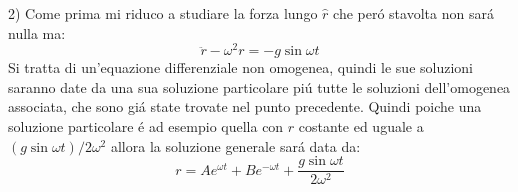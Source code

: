 \documentclass[../main.tex]{subfiles}
\begin{document}
2) Come prima mi riduco a studiare la forza lungo $\hat{r}$ che per\'{o} stavolta non sar\'{a} nulla ma:
\begin{equation}\label{avr:4}
  \ddot{r}-\omega^2r=-g \sin{\omega t}
 \end{equation}
Si tratta di un'equazione differenziale non omogenea, quindi le sue soluzioni saranno date da una sua soluzione particolare pi\'{u} tutte le soluzioni dell'omogenea associata,
che sono gi\'{a} state trovate nel punto precedente. Quindi poiche una soluzione particolare \'{e} ad esempio quella con $r$ costante ed uguale a 
$(g \sin{\omega t})/2\omega^2$ allora la soluzione generale sar\'{a} data da:
\begin{equation}\label{avr:5}
 r=Ae^{\omega t}+Be^{-\omega t}+\frac{g \sin{\omega t}}{2\omega^2}
\end{equation}
\end{document}
